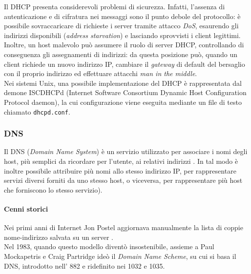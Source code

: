 \documentclass[a4paper, twoside]{article}
\def\code#1{\texttt{#1}}
\def\subsub#1{\subsubsection{#1}\label{#1}}
\def\vedi#1{\nameref{#1}}
\def\italic#1{\textit{#1}}
\begin{document}
Il DHCP presenta considerevoli problemi di sicurezza.
Infatti, l'assenza di autenticazione e di cifratura nei messaggi sono il punto debole del protocollo: è possibile sovraccaricare di richieste i server tramite attacco \italic{DoS}, esaurendo gli indirizzi disponibili (\italic{address starvation}) e lasciando sprovvisti i client legittimi. 
\\Inoltre, un host malevolo può assumere il ruolo di server DHCP, controllando di conseguenza gli assegnamenti di indirizzi: da questa posizione può, quando un client richiede un nuovo indirizzo IP, cambiare il \italic{gateway} di default del bersaglio con il proprio indirizzo ed effettuare attacchi \italic{man in the middle}.\\
Nei sistemi Unix, una possibile implementazione del DHCP è rappresentata dal demone ISCDHCPd (Internet Software Consortium
Dynamic Host Configuration Protocol daemon), la cui configurazione viene eseguita mediante un file di testo
chiamato \code{dhcpd.conf}.
\subsub{DNS}
Il DNS (\textit{Domain Name System}) è un servizio utilizzato per associare i nomi degli host, più semplici da ricordare per l'utente, ai relativi indirizzi  \vedi{IP}. In tal modo è inoltre possibile attribuire più nomi allo stesso indirizzo IP, per rappresentare servizi diversi forniti da uno stesso host, o viceversa, per rappresentare più host che forniscono lo stesso servizio).
\paragraph{Cenni storici} Nei primi anni di Internet Jon Postel aggiornava manualmente la lista di coppie nome-indirizzo salvata su un server \vedi{FTP}.\\ Nel 1983, quando questo modello diventò insostenibile, assieme a Paul Mockapetris e Craig Partridge ideò il \italic{Domain Name Scheme}, su cui si basa il DNS, introdotto nell'\vedi{RFC} 882 e ridefinito nei 1032 e 1035.
\end{document}
